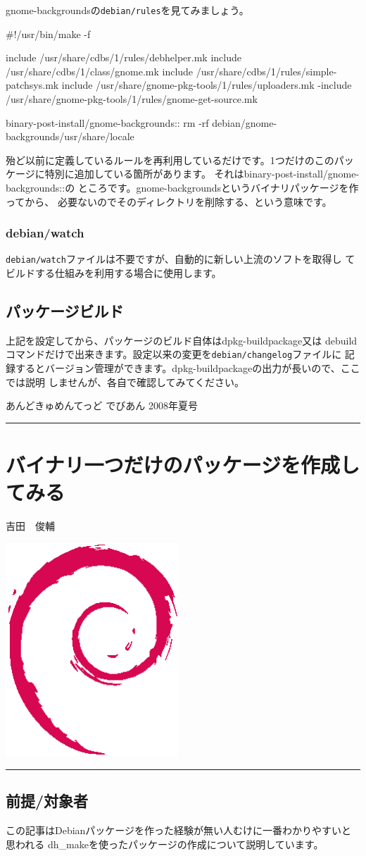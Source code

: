 \documentclass[mingoth,a4paper]{jsarticle}
\renewcommand{\dancersection}[2]{%
\newpage
あんどきゅめんてっど でびあん 2008年夏号
%
\vspace{0.1mm}\\
{\color{dancerlightblue}\rule{\hsize}{2mm}}

%
%
\begin{minipage}[t]{0.6\hsize}
\color{dancerdarkblue}
\vspace{1cm}
\section{#1}
\hfill{}#2\\
\end{minipage}
\begin{minipage}[t]{0.4\hsize}
\vspace{-2cm}
\hfill{}\includegraphics[height=8cm]{image200502/openlogo-nd.eps}\\
\vspace{-5cm}
\end{minipage}
%
%
{\color{dancerdarkblue}\rule{0.74\hsize}{2mm}}
%
\vspace{2cm}
}
\begin{document}
gnome-backgroundsの\texttt{debian/rules}を見てみましょう。

\begin{commandline}
#!/usr/bin/make -f

include /usr/share/cdbs/1/rules/debhelper.mk
include /usr/share/cdbs/1/class/gnome.mk
include /usr/share/cdbs/1/rules/simple-patchsys.mk
include /usr/share/gnome-pkg-tools/1/rules/uploaders.mk
-include /usr/share/gnome-pkg-tools/1/rules/gnome-get-source.mk

binary-post-install/gnome-backgrounds::
	rm -rf debian/gnome-backgrounds/usr/share/locale
\end{commandline}

殆ど以前に定義しているルールを再利用しているだけです。1つだけのこのパッ
ケージに特別に追加している箇所があります。
それはbinary-post-install/gnome-backgrounds::の
ところです。gnome-backgroundsというバイナリパッケージを作ってから、
必要ないのでそのディレクトリを削除する、という意味です。

\subsubsection{debian/watch}

\texttt{debian/watch}ファイルは不要ですが、自動的に新しい上流のソフトを取得し
てビルドする仕組みを利用する場合に使用します。

\subsection{パッケージビルド}

上記を設定してから、パッケージのビルド自体はdpkg-buildpackage又は
debuildコマンドだけで出来きます。設定以来の変更を\texttt{debian/changelog}ファイルに
記録するとバージョン管理ができます。dpkg-buildpackageの出力が長いので、ここでは説明
しませんが、各自で確認してみてください。

\dancersection{バイナリ一つだけのパッケージを作成してみる}{吉田　俊輔}
\label{sec:binpkg}

\subsection{前提/対象者}

この記事はDebianパッケージを作った経験が無い人むけに一番わかりやすいと思われる
dh\_makeを使ったパッケージの作成について説明しています。
\end{document}

